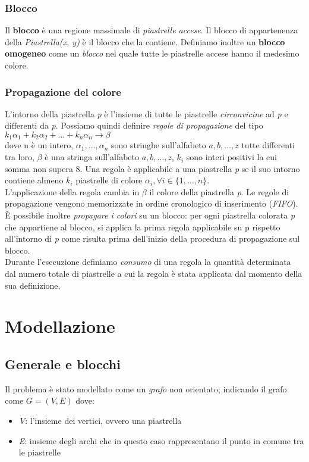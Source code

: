 \documentclass{article}
\begin{document}
\subsubsection{Blocco}
Il \textbf{blocco} è una regione massimale di \textit{piastrelle accese}. Il blocco di appartenenza della \textit{Piastrella(x, y)} è il blocco che la contiene.
Definiamo inoltre un \textbf{blocco omogeneo} come un \textit{blocco} nel quale tutte le piastrelle accese hanno il medesimo colore.

\subsubsection{Propagazione del colore}
L’intorno della piastrella \textit{p} è l’insieme di tutte le piastrelle \textit{circonvicine} ad \textit{p} e differenti da \textit{p}.
Possiamo quindi definire \textit{regole di propagazione} del tipo $k_{1} \alpha_{1} + k_{2}\alpha_{2} + \ldots + k_{n}\alpha_{n} \rightarrow \beta$\\
dove n è un intero, $\alpha_{1}, \ldots , \alpha_{n}$ sono stringhe sull’alfabeto ${a, b, \ldots , z}$ tutte differenti tra loro, $\beta$ è una stringa sull’alfabeto ${a, b, . . . , z}$, $k_i$ sono interi positivi la cui somma non supera 8.
Una regola è applicabile a una piastrella \textit{p} se il suo intorno contiene almeno $k_{i}$ piastrelle di colore $\alpha_{i}, \forall i \in \{1, \ldots, n\}$.\\
L'applicazione della regola cambia in $\beta$ il colore della piastrella \textit{p}.
Le regole di propagazione vengono memorizzate in ordine cronologico di inserimento (\textit{FIFO}).\\
È possibile inoltre \textit{propagare i colori} su un blocco: per ogni piastrella colorata \textit{p} che appartiene al blocco, si applica la prima regola applicabile su p rispetto all'intorno di \textit{p} come risulta prima dell'inizio della procedura di propagazione sul blocco.\\
Durante l’esecuzione definiamo \textit{consumo} di una regola la quantità determinata dal numero totale di piastrelle a cui la regola è stata applicata dal momento della sua definizione.

\section{Modellazione}

\subsection*{Generale e blocchi}
Il problema è stato modellato come un \textit{grafo} non orientato; indicando il grafo come $G = (V, E)$ dove:
\begin{itemize}
  \item \textit{V}: l'insieme dei vertici, ovvero una piastrella
  \item \textit{E}: insieme degli archi che in questo caso rappresentano il punto in comune tra le piastrelle
\end{itemize}
\end{document}
